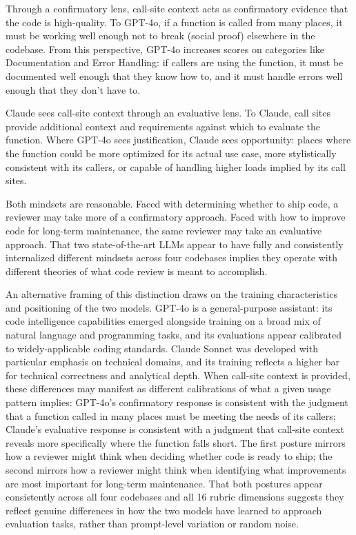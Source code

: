 \documentclass[12pt]{report}
\begin{document}
Through a confirmatory lens, call-site context acts as confirmatory evidence that the code is high-quality. To GPT-4o, if a function is called from many places, it must be working well enough not to break (social proof) elsewhere in the codebase. From this perspective, GPT-4o increases scores on categories like Documentation and Error Handling: if callers are using the function, it must be documented well enough that they know how to, and it must handle errors well enough that they don’t have to.

Claude sees call-site context through an evaluative lens. To Claude, call sites provide additional context and requirements against which to evaluate the function. Where GPT-4o sees justification, Claude sees opportunity: places where the function could be more optimized for its actual use case, more stylistically consistent with its callers, or capable of handling higher loads implied by its call sites.

Both mindsets are reasonable. Faced with determining whether to ship code, a reviewer may take more of a confirmatory approach. Faced with how to improve code for long-term maintenance, the same reviewer may take an evaluative approach. That two state-of-the-art LLMs appear to have fully and consistently internalized different mindsets across four codebases implies they operate with different theories of what code review is meant to accomplish.

An alternative framing of this distinction draws on the training characteristics and positioning of the two models. GPT-4o is a general-purpose assistant: its code intelligence capabilities emerged alongside training on a broad mix of natural language and programming tasks, and its evaluations appear calibrated to widely-applicable coding standards. Claude Sonnet was developed with particular emphasis on technical domains, and its training reflects a higher bar for technical correctness and analytical depth. When call-site context is provided, these differences may manifest as different calibrations of what a given usage pattern implies: GPT-4o's confirmatory response is consistent with the judgment that a function called in many places must be meeting the needs of its callers; Claude's evaluative response is consistent with a judgment that call-site context reveals more specifically where the function falls short. The first posture mirrors how a reviewer might think when deciding whether code is ready to ship; the second mirrors how a reviewer might think when identifying what improvements are most important for long-term maintenance. That both postures appear consistently across all four codebases and all 16 rubric dimensions suggests they reflect genuine differences in how the two models have learned to approach evaluation tasks, rather than prompt-level variation or random noise.
\end{document}
